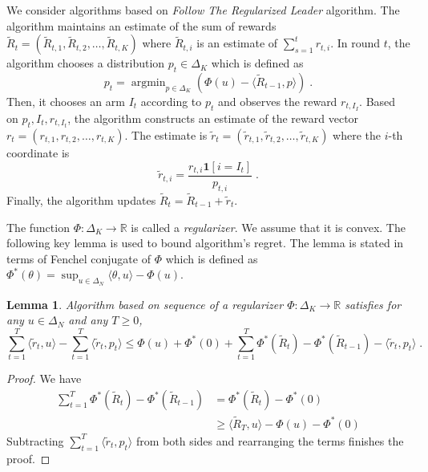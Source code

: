 \documentclass[12pt]{article}
\newtheorem{lemma}{Lemma}
\newcommand{\R}{\mathbb{R}}
\newcommand{\indicator}{\mathbf{1}}
\DeclareMathOperator{\argmin}{argmin}
\begin{document}
We consider algorithms based on \emph{Follow The Regularized Leader} algorithm.
The algorithm maintains an estimate of the sum of rewards $\widetilde R_t =
(\widetilde R_{t,1}, \widetilde R_{t,2}, \dots, \widetilde R_{t,K})$ where $\widetilde R_{t,i}$
is an estimate of $\sum_{s=1}^t r_{t,i}$.
In round $t$, the algorithm chooses a distribution $p_t \in \Delta_K$ which
is defined as
$$
p_t = \argmin_{p \in \Delta_K} \left( \Phi(u) - \langle \widetilde R_{t-1}, p \rangle \right) \; .
$$
Then, it chooses an arm $I_t$ according to $p_t$ and observes the reward $r_{t,I_I}$.
Based on $p_t, I_t, r_{t,I_t}$, the algorithm constructs an estimate of the reward vector $r_t = (r_{t,1}, r_{t,2}, \dots, r_{t,K})$.
The estimate is $\widetilde r_t = (\widetilde r_{t,1}, \widetilde r_{t,2}, \dots, \widetilde r_{t,K})$
where the $i$-th coordinate is
$$
\widetilde r_{t,i} = \frac{r_{t,i} \indicator[i=I_t]}{p_{t,i}}  \; .
$$
Finally, the algorithm updates $\widetilde R_t = \widetilde R_{t-1} + \widetilde r_t$.

The function $\Phi:\Delta_K \to \R$ is called a \emph{regularizer}. We assume
that it is convex.  The following key lemma is used to bound algorithm's
regret. The lemma is stated in terms of Fenchel conjugate of $\Phi$ which is
defined as $\Phi^*(\theta) = \sup_{u \in \Delta_N} \langle \theta, u \rangle -
\Phi(u)$.

\begin{lemma}
\label{lemma:ftrl-regret}
Algorithm based on sequence of a regularizer $\Phi:\Delta_K \to \R$ satisfies
for any $u \in \Delta_N$ and any $T \ge 0$,
\begin{equation}
\label{equation:ftrl-regret}
\sum_{t=1}^T \langle \widetilde r_t, u \rangle - \sum_{t=1}^T \langle \widetilde r_t, p_t \rangle
\le \Phi(u) + \Phi^*(0) + \sum_{t=1}^T \Phi^*(\widetilde R_t) - \Phi^*(\widetilde R_{t-1}) - \langle \widetilde r_t, p_t \rangle \; .
\end{equation}
\end{lemma}

\begin{proof}
We have
\begin{align*}
\sum_{t=1}^T \Phi^*(\widetilde R_t) - \Phi^*(\widetilde R_{t-1})
& = \Phi^*(\widetilde R_t) - \Phi^*(0) \\
& \ge \langle \widetilde R_T, u \rangle -  \Phi(u) - \Phi^*(0)
\end{align*}
Subtracting $\sum_{t=1}^T \langle \widetilde r_t, p_t \rangle$ from both sides
and rearranging the terms finishes the proof.
\end{proof}
\end{document}
